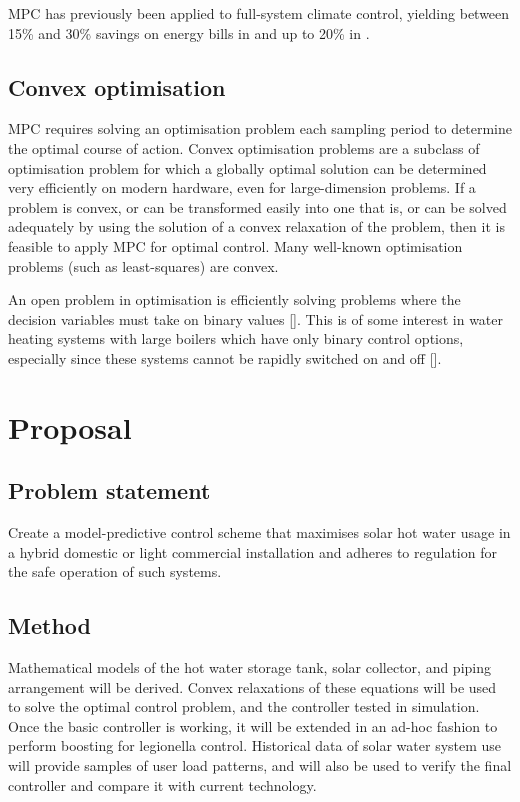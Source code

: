\documentclass{article}
\begin{document}
MPC has previously been applied to full-system climate control, yielding between
15\% and 30\% savings on energy bills in \cite{Siroky11} and up to 20\% in \cite{Ma12}.

\subsection{Convex optimisation}

MPC requires solving an optimisation problem each sampling period to determine
the optimal course of action.
Convex optimisation problems are a subclass of optimisation problem for which a
globally optimal solution can be determined very efficiently on modern hardware,
even for large-dimension problems.
If a problem is convex, or can be transformed easily into one that is, or can be
solved adequately by using the solution of a convex relaxation of the problem,
then it is feasible to apply MPC for optimal control.
Many well-known optimisation problems (such as least-squares) are convex.

An open problem in optimisation is efficiently solving problems where the decision
variables must take on binary values [].
This is of some interest in water heating systems with large boilers which have
only binary control options, especially since these systems cannot be rapidly
switched on and off [].

\section{Proposal}

\subsection{Problem statement}

Create a model-predictive control scheme that maximises solar hot water usage
in a hybrid domestic or light commercial installation and adheres to regulation
for the safe operation of such systems.

\subsection{Method}

Mathematical models of the hot water storage tank, solar collector, and piping
arrangement will be derived. Convex relaxations of these equations will be used
to solve the optimal control problem, and the controller tested in simulation.
Once the basic controller is working, it will be extended in an ad-hoc fashion
to perform boosting for legionella control.
Historical data of solar water system use will provide samples of user load
patterns, and will also be used to verify the final controller and compare it
with current technology.
\end{document}
